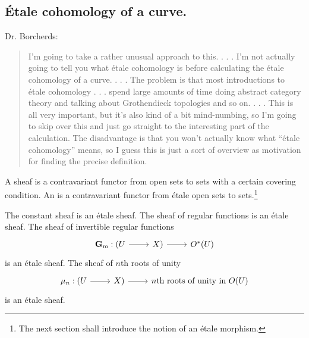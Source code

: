 \documentclass [11 pt, oneside] {article}
\begin{document}
\subsection{\'Etale cohomology of a curve.}
Dr. Borcherds:
\begin{quote}
	\small I'm going to take a rather unusual approach to this. . . . I'm not actually going to tell you what \'etale cohomology is before calculating the \'etale cohomology of a curve. . . . The problem is that most introductions to \'etale cohomology . . . spend large amounts of time doing abstract category theory and talking about Grothendieck topologies and so on. . . . This is all very important, but it's also kind of a bit mind-numbing, so I'm going to skip over this and just go straight to the interesting part of the calculation. The disadvantage is that you won't actually know what ``\'etale cohomology'' means, so I guess this is just a sort of overview as motivation for finding the precise definition.
\end{quote}

A sheaf is a contravariant functor from open sets to sets with a certain covering condition. 
An  is a contravariant functor from \'etale open sets to sets.\footnote{The next section shall introduce the notion of an \'etale morphism.} 

\begin{example}\label{}\text{}
The constant sheaf is an \'etale sheaf.
The sheaf of regular functions is an \'etale sheaf.
The sheaf of invertible regular functions
\[
\begin{tikzcd}
	\mathbf{G}\sub{m} : (U\ar[r]& X)\ar[r] &  \mathscr{O}^{*}(U)
\end{tikzcd}
\]
is an \'etale sheaf.
The sheaf of $n$th roots of unity
\[
\begin{tikzcd}
	\mu_{n} : (U\ar[r]&X) \ar[r] & \textrm{$n$th roots of unity in $\mathscr{O}(U)$}
\end{tikzcd}
\]
is an \'etale sheaf.
\end{example}
\end{document}
